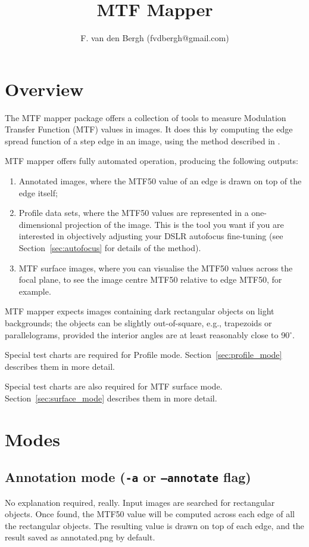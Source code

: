 \documentclass[a4paper]{article}
\title{MTF Mapper}
\author{F. van den Bergh (fvdbergh@gmail.com)}
\begin{document}
\maketitle

\section{Overview}
The MTF mapper package offers a collection of tools to measure Modulation
Transfer Function (MTF) values in images. It does this by computing the edge
spread function of a step edge in an image, using the method described in
\cite{khom}.

MTF mapper offers fully automated operation, producing the following
outputs:
\begin{enumerate}
    \item Annotated images, where the MTF50 value of an edge is drawn on top
of the edge itself;
    \item Profile data sets, where the MTF50 values are represented in a
one-dimensional projection of the image. This is the tool you want if you
are interested in objectively adjusting your DSLR autofocus fine-tuning (see
Section~\ref{sec:autofocus} for details of the method).
    \item MTF surface images, where you can visualise the MTF50 values
across the focal plane, to see the image centre MTF50 relative to edge MTF50,
for example.
\end{enumerate}

MTF mapper expects images containing dark rectangular objects on light
backgrounds; the objects can be slightly out-of-square, e.g., trapezoids or
parallelograms, provided the interior angles are at least reasonably close
to 90$^\circ$.

Special test charts are required for Profile mode.
Section~\ref{sec:profile_mode} describes them in more detail.

Special test charts are also required for MTF surface mode.
Section~\ref{sec:surface_mode} describes them in more detail.

\section{Modes}
\subsection{Annotation mode (\texttt{-a} or \texttt{--annotate} flag)}
No explanation required, really. Input images are searched for rectangular
objects. Once found, the MTF50 value will be computed across each edge of
all the rectangular objects. The resulting value is drawn on top of each
edge, and the result saved as \textrm{annotated.png} by default.
\end{document}
